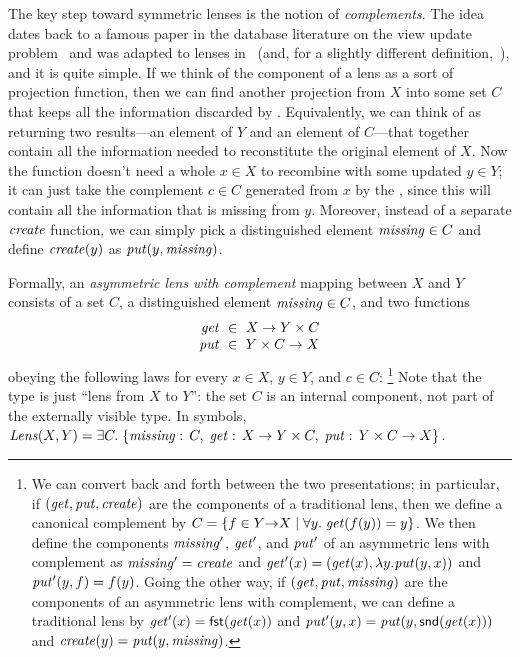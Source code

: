 %
The key  step toward symmetric lenses is the notion
of {\em complements}.  The idea dates back to a famous paper in the
database literature on the view update
problem~\cite{DBLP:journals/tods/BancilhonS81} and was adapted to
lenses in~\cite{Matching10} (and, for a slightly different
definition,~\cite{matsuda2007btb}), and it is quite simple.  If we think of
the    
\GET{} component of a lens as a sort of projection function, then we can find
another projection from $X$ into some set $C$ that
keeps all the information discarded by \GET{}.  Equivalently, we can think
of \GET{} as returning two results---an element of $Y$ and an element of
$C$---that together contain all the information needed to reconstitute the
original element of $X$.  Now the \PUT{} function doesn't need a whole $x\in
X$ to recombine with some updated $y\in Y$; it can
just take the complement $c\in C$ generated from $x$ by the \GET, since this
will 
contain all the information that is missing from $y$.  Moreover, instead of
a separate
$\mathit{create}$ function, we can simply pick a distinguished element
$\mathit{missing}\in C$ and define $\mathit{create}(y)$ as $\mathit{put}(y,\mathit{missing})$.

Formally, an {\em asymmetric lens with complement}
mapping between $X$ and $Y$ consists of a set $C$, a
distinguished element $\mathit{missing} \in C$, and two functions
\[
\begin{array}{r@{\ \;}c@{\ \;}l}
\GET &\in& X \arrow Y \times C\\
\PUT &\in& Y \times C \arrow X
\end{array}
\]
obeying the following laws for every $x \in X$, $y \in Y$, and $c \in C$:%
\footnote{We can convert back and
forth between the two presentations; in particular, if $(\mathit{get}, \mathit{put},
\mathit{create})$ are the components of a traditional lens, then we define a
canonical complement by $C=\{f\in Y{\rightarrow}X\mid \forall
y.\;\mathit{get}(f(y))=y\}$. We then define the components $\mathit{missing}'$, $\mathit{get}'$, and
$\mathit{put}'$ 
of an asymmetric lens with complement as $\mathit{missing}'=\mathit{create}$ and
$\mathit{get}'(x)=(\mathit{get}(x),\lambda y.\mathit{put}(y,x))$ and $\mathit{put}'(y,f)=f(y)$.
\iffull
Going the other way, if $(\mathit{get}, \mathit{put}, \mathit{missing})$ are the components of an
asymmetric lens with complement, we can define a traditional lens by
$\mathit{get}'(x) = \mathsf{fst}(\mathit{get}(x))$ and $\mathit{put}'(y,x) = \mathit{put}(y,\mathsf{snd}(\mathit{get}(x)))$
and $\mathit{create}(y) = \mathit{put}(y,\mathit{missing})$.
\fi
}
%
Note that the type is just ``lens from $X$ to $Y$'': the set
$C$ is an internal component, not part of the externally visible type.
In symbols, $ \mathit{Lens}(X,Y) =
\exists C.\; \{ \mathord{\mathit{missing}}:\, C,\; \mathit{get}:\,X \rightarrow Y
\times C,\; \mathit{put}:\,Y \times C \rightarrow X \}$.

